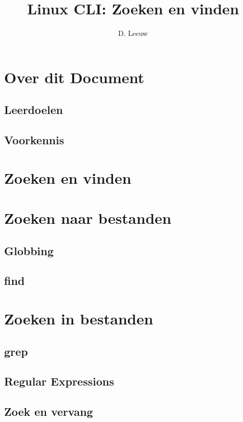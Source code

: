 \documentclass[a4paper,12pt,twoside,openright,titlepage]{article}
\author{D. Leeuw}
\title{Linux CLI: Zoeken en vinden}
\date{\today\\
1.0.0\\
\vfill
\raggedright
\copyright\ 2020-2025 Dennis Leeuw\\
}
\begin{document}

\maketitle


\section{Over dit Document}
\subsection{Leerdoelen}

\subsection{Voorkennis}



\section{Zoeken en vinden}\label{zoekenenvinden}

\section{Zoeken naar bestanden}
\subsection{Globbing}

\subsection{find}


\section{Zoeken in bestanden}

\subsection{grep}

\subsection{Regular Expressions}

\subsection{Zoek en vervang}


\printindex
\end{document}
